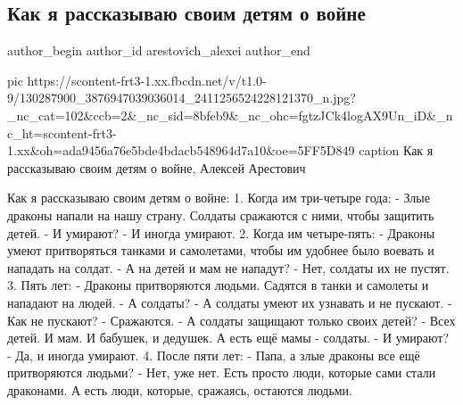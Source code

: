  
 
 
 
 
 
\subsection{Как я рассказываю своим детям о войне}
\label{sec:06_12_2020.fb.arestovich_alexei.1.detjam_o_vojne}
\ifcmt
	author_begin
   author_id arestovich_alexei
	author_end
\fi

\ifcmt
pic https://scontent-frt3-1.xx.fbcdn.net/v/t1.0-9/130287900_3876947039036014_2411256524228121370_n.jpg?_nc_cat=102&ccb=2&_nc_sid=8bfeb9&_nc_ohc=fgtzJCk4logAX9Un_iD&_nc_ht=scontent-frt3-1.xx&oh=ada9456a76e5bde4bdacb548964d7a10&oe=5FF5D849
caption Как я рассказываю своим детям о войне, Алексей Арестович
\fi

\obeycr
Как я рассказываю своим детям о войне:
1. Когда им три-четыре года: 
- Злые драконы напали на нашу страну. Солдаты сражаются с ними, чтобы защитить детей.
- И умирают?
- И иногда умирают.
2. Когда им четыре-пять:
- Драконы умеют притворяться танками и самолетами, чтобы им удобнее было воевать и нападать на солдат.
- А на детей и мам не нападут?
- Нет, солдаты их не пустят.
3. Пять лет:
- Драконы притворяются людьми. Садятся в танки и самолеты и нападают на людей. 
- А солдаты?
- А солдаты умеют их узнавать и не пускают.
- Как не пускают?
- Сражаются.
- А солдаты защищают только своих детей?
- Всех детей. И мам. И бабушек, и дедушек. А есть ещё мамы - солдаты. 
- И умирают? 
- Да, и иногда умирают.
4. После пяти лет:
- Папа, а злые драконы все ещё притворяются людьми?
- Нет, уже нет.
Есть просто люди, которые сами стали драконами. 
А есть люди, которые, сражаясь, остаются людьми.
\restorecr

